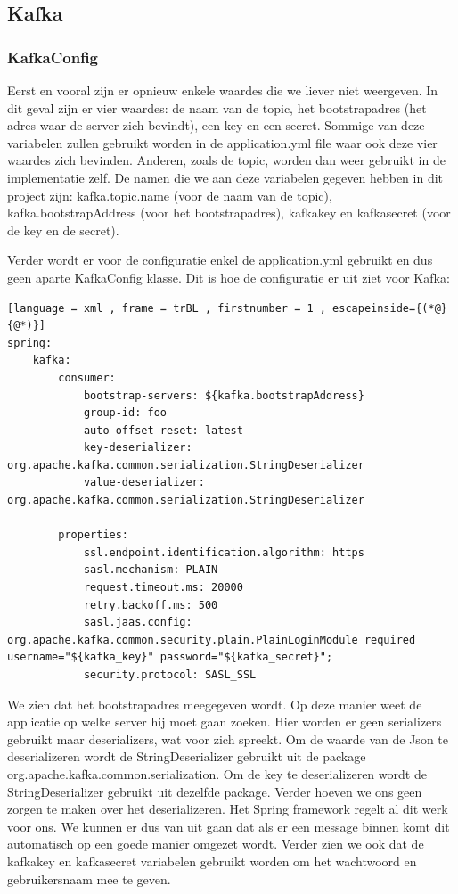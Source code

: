 \subsection{Kafka}
\subsubsection{KafkaConfig}
Eerst en vooral zijn er opnieuw enkele waardes die we liever niet weergeven. In dit geval zijn er vier waardes: de  naam van de topic, het bootstrapadres (het adres waar de server zich bevindt), een key en een secret. Sommige van deze variabelen zullen gebruikt worden in de application.yml file waar ook deze vier waardes zich bevinden. Anderen, zoals de topic, worden dan weer gebruikt in de implementatie zelf. De namen die we aan deze variabelen gegeven hebben in dit project zijn: kafka.topic.name (voor de naam van de topic), kafka.bootstrapAddress (voor het bootstrapadres), kafka\textunderscore key en kafka\textunderscore secret (voor de key en de secret).

Verder wordt er voor de configuratie enkel de application.yml gebruikt en dus geen aparte KafkaConfig klasse. Dit is hoe de configuratie er uit ziet voor Kafka:
\begin{lstlisting}[language = xml , frame = trBL , firstnumber = 1 , escapeinside={(*@}{@*)}]
spring:
    kafka:
        consumer:
            bootstrap-servers: ${kafka.bootstrapAddress}
            group-id: foo
            auto-offset-reset: latest
            key-deserializer: org.apache.kafka.common.serialization.StringDeserializer
            value-deserializer: org.apache.kafka.common.serialization.StringDeserializer

        properties:
            ssl.endpoint.identification.algorithm: https
            sasl.mechanism: PLAIN
            request.timeout.ms: 20000
            retry.backoff.ms: 500
            sasl.jaas.config: org.apache.kafka.common.security.plain.PlainLoginModule required username="${kafka_key}" password="${kafka_secret}";
            security.protocol: SASL_SSL
\end{lstlisting}

We zien dat het bootstrapadres meegegeven wordt. Op deze manier weet de applicatie op welke server hij moet gaan zoeken. Hier worden er geen serializers gebruikt maar deserializers, wat voor zich spreekt. Om de waarde van de Json te deserializeren wordt de StringDeserializer gebruikt uit de package org.apache.kafka.common.serialization. Om de key te deserializeren wordt de StringDeserializer gebruikt uit dezelfde package. Verder hoeven we ons geen zorgen te maken over het deserializeren. Het Spring framework regelt al dit werk voor ons. We kunnen er dus van uit gaan dat als er een message binnen komt dit automatisch op een goede manier omgezet wordt. Verder zien we ook dat de kafka\textunderscore key en kafka\textunderscore secret variabelen gebruikt worden om het wachtwoord en gebruikersnaam mee te geven.

